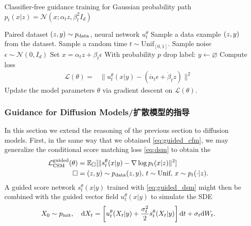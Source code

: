 \begin{algorithm}[h]
\caption{Classifier-free guidance training for Gaussian probability path $p_t(x|z)=\mathcal{N}(x;\alpha_tz,\beta_t^2I_d)$}
\label{alg:training_fm_score_matching_gaussian_paths}
\begin{algorithmic}[1]
\REQUIRE Paired dataset $(z,y)\sim p_{\rm{data}}$, neural network $u_t^\theta$
    \STATE Sample a data example $(z,y)$ from the dataset.
    \STATE Sample a random time $t \sim \text{Unif}_{[0,1]}$.
    \STATE Sample noise $\epsilon\sim\mathcal{N}(0,I_d)$
    \STATE Set $x=\alpha_t z + \beta_t \epsilon$
    \STATE With probability $p$ drop label: $y\leftarrow \varnothing$
    \STATE Compute loss
    \begin{align*}
        \mathcal{L}(\theta) =& \|u_t^\theta(x|y)-(\dot{\alpha}_t\epsilon+\dot{\beta}_tz)\|^2 
    \end{align*}
    \STATE Update the model parameters $\theta$ via gradient descent on $\mathcal{L}(\theta)$.
\ENDFOR
\end{algorithmic}
\end{algorithm}

\subsubsection{Guidance for Diffusion Models/扩散模型的指导}
In this section we extend the reasoning of the previous section to diffusion models. First, in the same way that we obtained \cref{eq:guided_cfm}, we may generalize the conditional score matching loss \cref{eq:dsm} to obtain the 
\begin{align}
    \label{eq:guided_dsm}
    \mathcal{L}_{\text{CSM}}^{\text{guided}}(\theta) &= \mathbb{E}_{\square}[\|s_t^\theta(x|y) - \nabla\log p_t(x|z)\|^2]\\
    \square &= (z,y)\sim p_{\rm{data}}(z,y), \,t\sim \text{Unif},\,x\sim p_t(\cdot|z).
\end{align}
A guided score network $s_t^\theta(x|y)$ trained with \cref{eq:guided_dsm} might then be combined with the guided vector field $u_t^\theta(x|y)$ to simulate the SDE
\begin{equation*}
    X_0 \sim p_{\rm{init}},\quad \mathrm{d} X_t = \left[u_t^\theta(X_t|y)+\frac{\sigma_t^2}{2}s_t^\theta(X_t|y)\right]\mathrm{d} t + \sigma_t\mathrm{d} W_t.
\end{equation*}

